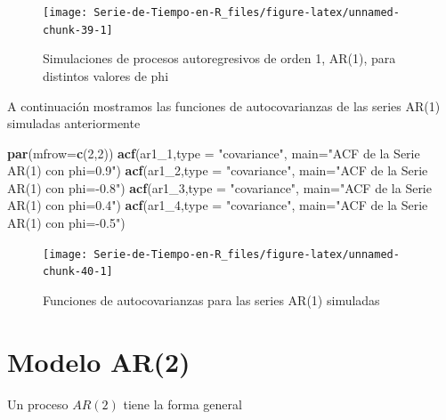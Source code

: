 \documentclass[12pt,]{krantz}
\makeatletter
\newenvironment{Shaded}{\begin{snugshade}}{\end{snugshade}}
\newcommand{\KeywordTok}[1]{\textcolor[rgb]{0.13,0.29,0.53}{\textbf{#1}}}
\newcommand{\DataTypeTok}[1]{\textcolor[rgb]{0.13,0.29,0.53}{#1}}
\newcommand{\DecValTok}[1]{\textcolor[rgb]{0.00,0.00,0.81}{#1}}
\newcommand{\StringTok}[1]{\textcolor[rgb]{0.31,0.60,0.02}{#1}}
\newcommand{\NormalTok}[1]{#1}
\newenvironment{kframe}{%
\medskip{}
\setlength{\fboxsep}{.8em}
 \def\at@end@of@kframe{}%
 \ifinner\ifhmode%
  \def\at@end@of@kframe{\end{minipage}}%
  \begin{minipage}{\columnwidth}%
 \fi\fi%
 \def\FrameCommand##1{\hskip\@totalleftmargin \hskip-\fboxsep
 \colorbox{shadecolor}{##1}\hskip-\fboxsep
     \hskip-\linewidth \hskip-\@totalleftmargin \hskip\columnwidth}%
 \MakeFramed {\advance\hsize-\width
   \@totalleftmargin\z@ \linewidth\hsize
   \@setminipage}}%
 {\par\unskip\endMakeFramed%
 \at@end@of@kframe}
\renewenvironment{Shaded}{\begin{kframe}}{\end{kframe}}
\theoremstyle{definition}
\theoremstyle{definition}
\theoremstyle{definition}
\theoremstyle{remark}
\makeatother
\begin{document}
\begin{figure}

{\centering \texttt{[image: Serie-de-Tiempo-en-R\_files/figure-latex/unnamed-chunk-39-1]} 

}

\caption{Simulaciones de procesos autoregresivos de orden 1, AR(1), para distintos valores de phi}\label{fig:unnamed-chunk-39}
\end{figure}

A continuación mostramos las funciones de autocovarianzas de las series
AR(1) simuladas anteriormente

\begin{Shaded}
\begin{Highlighting}[]
\KeywordTok{par}\NormalTok{(}\DataTypeTok{mfrow=}\KeywordTok{c}\NormalTok{(}\DecValTok{2}\NormalTok{,}\DecValTok{2}\NormalTok{))}
\KeywordTok{acf}\NormalTok{(ar1_}\DecValTok{1}\NormalTok{,}\DataTypeTok{type =} \StringTok{"covariance"}\NormalTok{, }\DataTypeTok{main=}\StringTok{"ACF de la Serie AR(1) con phi=0.9"}\NormalTok{)}
\KeywordTok{acf}\NormalTok{(ar1_}\DecValTok{2}\NormalTok{,}\DataTypeTok{type =} \StringTok{"covariance"}\NormalTok{, }\DataTypeTok{main=}\StringTok{"ACF de la Serie AR(1) con phi=-0.8"}\NormalTok{)}
\KeywordTok{acf}\NormalTok{(ar1_}\DecValTok{3}\NormalTok{,}\DataTypeTok{type =} \StringTok{"covariance"}\NormalTok{, }\DataTypeTok{main=}\StringTok{"ACF de la Serie AR(1) con phi=0.4"}\NormalTok{)}
\KeywordTok{acf}\NormalTok{(ar1_}\DecValTok{4}\NormalTok{,}\DataTypeTok{type =} \StringTok{"covariance"}\NormalTok{, }\DataTypeTok{main=}\StringTok{"ACF de la Serie AR(1) con phi=-0.5"}\NormalTok{)}
\end{Highlighting}
\end{Shaded}

\begin{figure}

{\centering \texttt{[image: Serie-de-Tiempo-en-R\_files/figure-latex/unnamed-chunk-40-1]} 

}

\caption{Funciones de autocovarianzas para las series AR(1) simuladas}\label{fig:unnamed-chunk-40}
\end{figure}

\section{Modelo AR(2)}\label{modelo-ar2}

Un proceso \(AR(2)\) tiene la forma general
\end{document}
